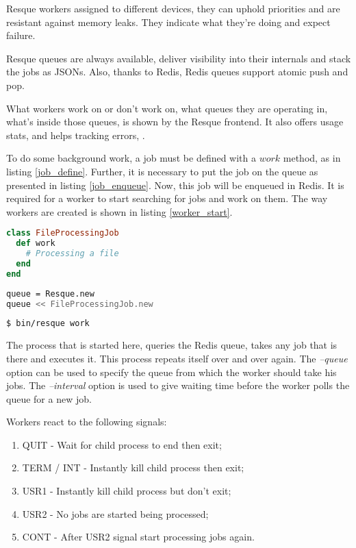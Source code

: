 Resque workers assigned to different devices, they can uphold priorities and are resistant against memory leaks. They indicate what they're doing and expect failure.

Resque queues are always available, deliver visibility into their internals and stack the jobs as JSONs. Also, thanks to Redis, Redis queues support atomic push and pop.

What workers work on or don't work on, what queues they are operating in, what's inside those queues, is shown by the Resque frontend. It also offers usage stats, and helps tracking errors, \cite{resque_readme}.

To do some background work, a job must be defined with a $work$ method, as in listing \ref{job_define}. Further, it is necessary to put the job on the queue as presented in listing \ref{job_enqueue}. Now, this job will be enqueued in Redis. It is required for a worker to start searching for jobs and work on them. The way workers are created is shown in listing \ref{worker_start}.

\begin{lstlisting}[language=Ruby, caption={Defining a job class}, label=job_define]
class FileProcessingJob
  def work
    # Processing a file
  end
end
\end{lstlisting}


\begin{lstlisting}[language=Bash, caption={Enqueue a job}, label=job_enqueue]
queue = Resque.new
queue << FileProcessingJob.new
\end{lstlisting}

\begin{lstlisting}[language=Bash, caption={Create a worker}, label=worker_start]
$ bin/resque work
\end{lstlisting}

The process that is started here, queries the Redis queue, takes any job that is there and executes it. This process repeats itself over and over again. The \textit{--queue} option can be used to specify the queue from which the worker should take his jobs. The \textit{--interval} option is used to give waiting time before the worker polls the queue for a new job.

Workers react to the following signals:
\begin{enumerate}
  \item QUIT - Wait for child process to end then exit;
  \item TERM / INT - Instantly kill child process then exit;
  \item USR1 - Instantly kill child process but don't exit;
  \item USR2 - No jobs are started being processed;
  \item CONT - After USR2 signal start processing jobs again.
\end{enumerate}

